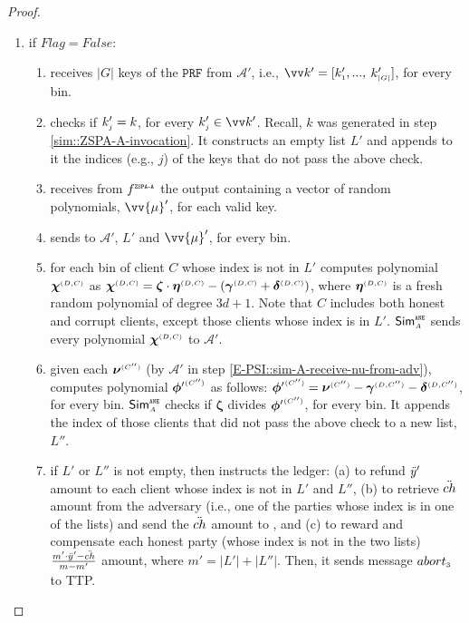 \begin{proof}
\begin{enumerate}
\begin{enumerate}
\item if $Flag=False$: 
\begin{enumerate}
%
 \item receives $|G|$ keys of the $\mathtt{PRF}$ from $\mathcal{A}'$, i.e., $\vv k'=[  k'_{\st 1}, ...,$ $  k'_{\scriptscriptstyle |G|}]$, for every bin. %
\item checks if $ k'_{\scriptscriptstyle j}= k$, for every $ k'_{\st j}\in\vv k'$. Recall,  $ k$ was generated in step \ref{sim::ZSPA-A-invocation}. It constructs an empty list $ L'$ and appends to it the indices (e.g., $j$) of the keys that do not pass the above check. 
 \item receives from $f^{\scriptscriptstyle \mathtt{ZSPA\text{-}A}}$ the output containing a vector of random polynomials, $\vv{\mu}'$, for each valid key. 
 \item sends to  $\mathcal{A}'$, $ L'$ and $\vv{\mu}'$, for every bin. 
 \item  for each bin of client $  {  C}$ whose index is not in $ L'$ computes polynomial ${\bm\chi}^{ \scriptscriptstyle {  {(D, C)}}}$ as
 ${\bm\chi}^{ \scriptscriptstyle {  {(D, C)}}}={\bm\zeta}\cdot {\bm\eta}^{ \scriptscriptstyle {  {(D,C)}}}-({\bm\gamma}^{ \scriptscriptstyle {  {(D,C)}}}+{\bm\delta}^{ \scriptscriptstyle {  {(D,C)}}})$,   where ${\bm\eta}^{ \scriptscriptstyle {  {(D,C)}}}$ is a fresh random polynomial of degree $3d+1$. Note that  $C$ includes both honest and corrupt clients, except those clients whose index is in  $ L'$. $\mathsf{Sim}^{\scriptscriptstyle \mathtt{ANE}}_{\scriptscriptstyle A}$ sends every polynomial ${\bm\chi}^{ \scriptscriptstyle {  {(D, C)}}}$ to  $\mathcal{A}'$. 
 \item\label{sim::case1-check-final-res-for-each-client} given each ${\bm\nu}^{ \scriptscriptstyle {  {(C'')}} }$ (by $\mathcal{A}'$ in step \ref{E-PSI::sim-A-receive-nu-from-adv}), computes polynomial $ {\bm\phi'}^{ \scriptscriptstyle {  {(C'')}} }$ as follows: ${\bm\phi'}^{ \scriptscriptstyle {  {(C'')}} } = {\bm\nu}^{ \scriptscriptstyle {  {(C'')}} }- {\bm\gamma}^{ \scriptscriptstyle {  {(D,C'')}}} - {\bm\delta}^{ \scriptscriptstyle {  {(D,C'')}}}$, for every bin.  $\mathsf{Sim}^{\scriptscriptstyle \mathtt{ANE}}_{\scriptscriptstyle A}$ checks if  ${\bm\zeta}$  divides $ {\bm\phi'}^{ \scriptscriptstyle {  {(C'')}} }$, for every bin. It appends the index of those clients that did not pass the above check to a new list, $ L''$. 
 \item if  $ L'$ or $ L''$ is not empty, then instructs the ledger: (a) to refund $\ddot{y}'$ amount to each  client whose index is not in $ L'$ and $ L''$, (b) to retrieve $\ddot{ch}$ amount from the adversary (i.e., one of the parties whose index is in one of the lists) and send the $\ddot{ch}$ amount to \aud, and (c) to reward and compensate each honest party (whose index is not in the two lists)  $\frac{m'\cdot \ddot{y}'-\ddot{ch}}{m-m'}$ amount, where $m'=| L'|+| L''|$.  Then, it sends message $abort_{\scriptscriptstyle 3}$ to TTP. 

\end{enumerate}
\end{enumerate}
\end{enumerate}
\end{proof}
